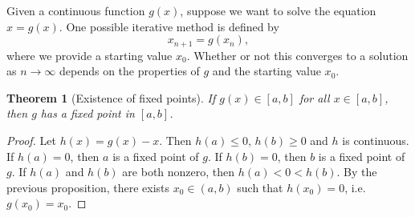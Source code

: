 \documentclass{article}
\theoremstyle{plain}
\newtheorem{theorem}[proposition]{Theorem}
\theoremstyle{definition}
\begin{document}
Given a continuous function $g(x)$, suppose we want to solve the equation $x = g(x)$.
One possible iterative method is defined by
\begin{equation}\label{eq:iterative_method}
  x_{n+1} = g(x_n),
\end{equation}
where we provide a starting value $x_0$.
Whether or not this converges to a solution as $n \to \infty$ depends on the properties of $g$ and the starting value $x_0$.

\begin{theorem}[Existence of fixed points]
  If $g(x) \in [a,b]$ for all $x \in [a,b]$, then $g$ has a fixed point in $[a,b]$.
\end{theorem}
\begin{proof}
  Let $h(x) = g(x) - x$.
  Then $h(a) \leq 0$, $h(b) \geq 0$ and $h$ is continuous.
  If $h(a) = 0$, then $a$ is a fixed point of $g$.
  If $h(b) = 0$, then $b$ is a fixed point of $g$.
  If $h(a)$ and $h(b)$ are both nonzero, then $h(a) < 0 < h(b)$.
  By the previous proposition, there exists $x_0 \in (a,b)$ such that $h(x_0) = 0$, i.e. $g(x_0) = x_0$.
\end{proof}
\end{document}
